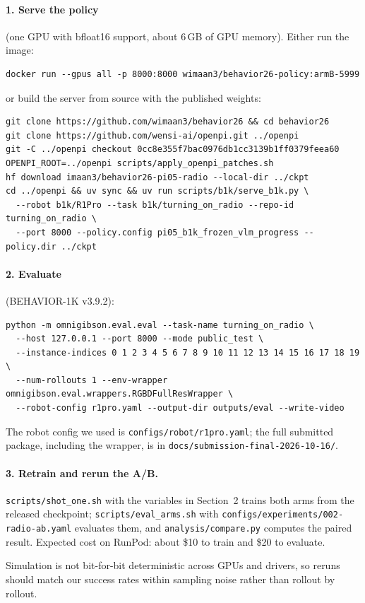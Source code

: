 \documentclass[10pt]{article}
\newcommand{\code}[1]{\texttt{#1}}
\begin{document}
\paragraph{1. Serve the policy} (one GPU with bfloat16 support, about 6\,GB of GPU memory).
Either run the image:
\begin{verbatim}
docker run --gpus all -p 8000:8000 wimaan3/behavior26-policy:armB-5999
\end{verbatim}
or build the server from source with the published weights:
\begin{verbatim}
git clone https://github.com/wimaan3/behavior26 && cd behavior26
git clone https://github.com/wensi-ai/openpi.git ../openpi
git -C ../openpi checkout 0cc8e355f7bac0976db1cc3139b1ff0379feea60
OPENPI_ROOT=../openpi scripts/apply_openpi_patches.sh
hf download imaan3/behavior26-pi05-radio --local-dir ../ckpt
cd ../openpi && uv sync && uv run scripts/b1k/serve_b1k.py \
  --robot b1k/R1Pro --task b1k/turning_on_radio --repo-id turning_on_radio \
  --port 8000 --policy.config pi05_b1k_frozen_vlm_progress --policy.dir ../ckpt
\end{verbatim}

\paragraph{2. Evaluate} (BEHAVIOR-1K v3.9.2):
\begin{verbatim}
python -m omnigibson.eval.eval --task-name turning_on_radio \
  --host 127.0.0.1 --port 8000 --mode public_test \
  --instance-indices 0 1 2 3 4 5 6 7 8 9 10 11 12 13 14 15 16 17 18 19 \
  --num-rollouts 1 --env-wrapper omnigibson.eval.wrappers.RGBDFullResWrapper \
  --robot-config r1pro.yaml --output-dir outputs/eval --write-video
\end{verbatim}
The robot config we used is \code{configs/robot/r1pro.yaml}; the full submitted package, including the wrapper, is in \code{docs/submission-final-2026-10-16/}.

\paragraph{3. Retrain and rerun the A/B.} \code{scripts/shot\_one.sh} with the variables in
Section~2 trains both arms from the released checkpoint; \code{scripts/eval\_arms.sh} with
\code{configs/experiments/002-radio-ab.yaml} evaluates them, and \code{analysis/compare.py}
computes the paired result. Expected cost on RunPod: about \$10 to train and \$20 to evaluate.

Simulation is not bit-for-bit deterministic across GPUs and drivers, so reruns should match
our success rates within sampling noise rather than rollout by rollout.
\end{document}
